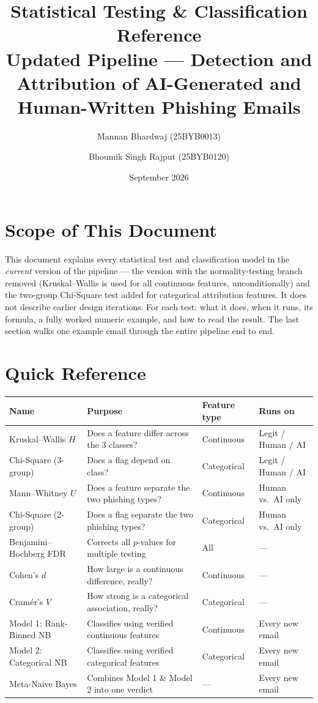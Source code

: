 \documentclass[11pt]{article}
\title{\textbf{Statistical Testing \& Classification Reference}\\[4pt]
\large Updated Pipeline --- Detection and Attribution of AI-Generated and\\
Human-Written Phishing Emails}
\author{Mannan Bhardwaj (25BYB0013) \and Bhoumik Singh Rajput (25BYB0120)}
\date{September 2026}
\begin{document}
\maketitle

\section*{Scope of This Document}
This document explains every statistical test and classification model in the \emph{current} version
of the pipeline --- the version with the normality-testing branch removed (Kruskal--Wallis is used for
all continuous features, unconditionally) and the two-group Chi-Square test added for categorical
attribution features. It does not describe earlier design iterations. For each test: what it does, when
it runs, its formula, a fully worked numeric example, and how to read the result. The last section walks
one example email through the entire pipeline end to end.

\section{Quick Reference}

\begin{table}[h]
\centering
\renewcommand{\arraystretch}{1.3}
\begin{tabular}{p{2.7cm}p{4.3cm}p{3.3cm}p{2.6cm}}
\toprule
\textbf{Name} & \textbf{Purpose} & \textbf{Feature type} & \textbf{Runs on} \\
\midrule
Kruskal--Wallis $H$ & Does a feature differ across the 3 classes? & Continuous & Legit / Human / AI \\
Chi-Square (3-group) & Does a flag depend on class? & Categorical & Legit / Human / AI \\
Mann--Whitney $U$ & Does a feature separate the two phishing types? & Continuous & Human vs.\ AI only \\
Chi-Square (2-group) & Does a flag separate the two phishing types? & Categorical & Human vs.\ AI only \\
Benjamini--Hochberg FDR & Corrects all $p$-values for multiple testing & All & --- \\
Cohen's $d$ & How large is a continuous difference, really? & Continuous & --- \\
Cram\'er's $V$ & How strong is a categorical association, really? & Categorical & --- \\
\midrule
Model 1: Rank-Binned NB & Classifies using verified continuous features & Continuous & Every new email \\
Model 2: Categorical NB & Classifies using verified categorical features & Categorical & Every new email \\
Meta-Naive Bayes & Combines Model 1 \& Model 2 into one verdict & --- & Every new email \\
\bottomrule
\end{tabular}
\end{table}
\end{document}
